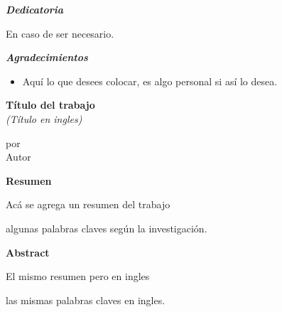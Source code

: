 \thispagestyle{empty}
\vspace*{\fill}
\begin{flushright}
\begin{minipage}{\mitad}
{\Large\bf \em Dedicatoria}

\smallskip
En caso de ser necesario.
\end{minipage}
\end{flushright}
\vspace*{\fill}
\newpage
\thispagestyle{empty}
\vspace*{\fill}
\begin{center}{\Large\bf \em Agradecimientos}\end{center}

\vfill
\begin{itemize}
     \item Aquí lo que desees colocar, es algo personal si así lo desea.
     \end{itemize}
\vspace*{\fill}
\begin{flushright}
{\fontsize{20}{0}\selectfont{Autor}}
\end{flushright}
\vspace*{\fill}
\newpage
\vfill
\thispagestyle{empty}
\begin{center}
{\large\bf Título del trabajo}\\
{\textit{(Título en ingles)}}

\vspace{1cm}
por\\
{\small Autor}
\end{center}

\begin{center}
\textbf{Resumen}
\end{center}

Acá se agrega un resumen del trabajo 

 algunas palabras claves según la investigación.

\begin{center}
\textbf{Abstract}
\end{center}
El mismo resumen pero en ingles

 las mismas palabras claves en ingles.
\vfill
\newpage 
